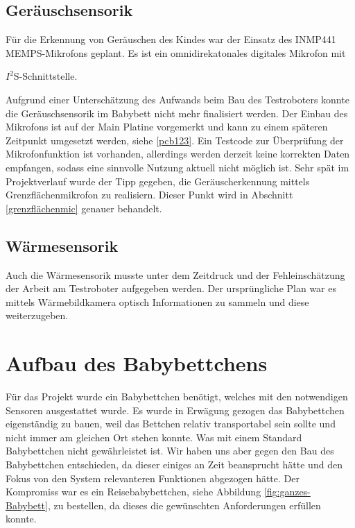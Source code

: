 \subsection{Geräuschsensorik} \label{INMP441}
Für die Erkennung von Geräuschen des Kindes war der Einsatz des INMP441 MEMPS-Mikrofons \cite{inmp441_datasheet} geplant.
Es ist ein omnidirekatonales digitales Mikrofon mit 

\noindent
$I^2$S-Schnittstelle. 
\par\vspace{1em} 
\noindent
Aufgrund einer Unterschätzung des Aufwands beim Bau des Testroboters konnte die Geräuschsensorik im Babybett nicht mehr finalisiert werden.
Der Einbau des Mikrofons ist auf der Main Platine vorgemerkt und kann zu einem späteren Zeitpunkt umgesetzt werden, siehe \ref{pcb123}.
Ein Testcode zur Überprüfung der Mikrofonfunktion ist vorhanden, allerdings werden derzeit keine korrekten Daten empfangen, sodass eine sinnvolle Nutzung aktuell nicht möglich ist. 
Sehr spät im Projektverlauf wurde der Tipp gegeben, die Geräuscherkennung mittels Grenzflächenmikrofon zu realisiern. Dieser Punkt wird in Abschnitt \ref{grenzflächenmic}
genauer behandelt. 
\subsection{Wärmesensorik}
Auch die Wärmesensorik musste unter dem Zeitdruck und der Fehleinschätzung der Arbeit am Testroboter aufgegeben werden. Der ursprüngliche Plan war es mittels Wärmebildkamera 
optisch Informationen zu sammeln und diese weiterzugeben. 

\section[Aufbau des Babybettchens]{Aufbau des Babybettchens\authorlinda}
Für das Projekt wurde ein Babybettchen benötigt, welches mit den notwendigen Sensoren ausgestattet wurde. Es wurde in Erwägung gezogen das Babybettchen eigenständig zu bauen, weil das Bettchen relativ transportabel sein sollte und nicht immer am gleichen Ort stehen konnte. Was mit einem Standard Babybettchen nicht gewährleistet ist. 
Wir haben uns aber gegen den Bau des Babybettchen entschieden, da dieser einiges an Zeit beansprucht hätte und den Fokus von den System relevanteren Funktionen abgezogen hätte. 
Der Kompromiss war es ein Reisebabybettchen, siehe Abbildung \ref{fig:ganzes-Babybett}, zu bestellen, 
da dieses die gewünschten Anforderungen erfüllen konnte. \cite{costway_reisebett} 


